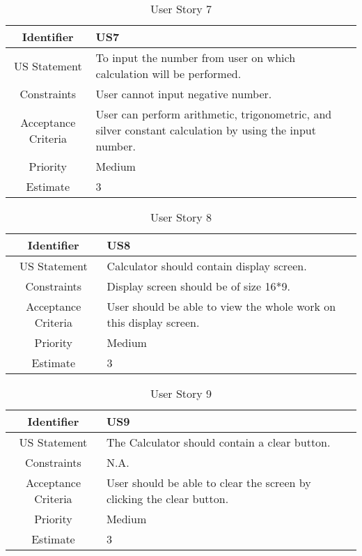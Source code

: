 \documentclass[12pt]{article}
\begin{document}
\begin{table}[h]
    \begin{tabular}{|c|p{14cm}|}
    \hline
      Identifier   & US7 \\
      \hline
       US Statement  & To input the number from user on which calculation will be performed. \\
       \hline
       Constraints & User cannot input negative number.\\
       \hline
       Acceptance Criteria & User can perform arithmetic, trigonometric, and silver constant calculation by using the input number. \\
       \hline
       Priority & Medium\\
       \hline
       Estimate & 3\\
       \hline
    \end{tabular}
    \caption{User Story 7}
\label{table:7}
\end{table}

\begin{table}[h]
    \begin{tabular}{|c|p{14cm}|}
    \hline
      Identifier   & US8 \\
      \hline
       US Statement  & Calculator should contain display screen. \\
       \hline
       Constraints & Display screen should be of size 16*9.\\
       \hline
       Acceptance Criteria & User should be able to view the whole work on this display screen. \\
       \hline
       Priority & Medium\\
       \hline
       Estimate & 3\\
       \hline
    \end{tabular}
    \caption{User Story 8}
\label{table:8}
\end{table}



\begin{table}[h]
    \begin{tabular}{|c|p{14cm}|}
    \hline
      Identifier   & US9 \\
      \hline
       US Statement  & The Calculator should contain a clear button.  \\
       \hline
       Constraints & N.A.\\
       \hline
       Acceptance Criteria & User should be able to clear the screen by clicking the clear button.\\
       \hline
       Priority & Medium\\
       \hline
       Estimate & 3\\
       \hline
    \end{tabular}
    \caption{User Story 9}
\label{table:9}
\end{table}
\end{document}
